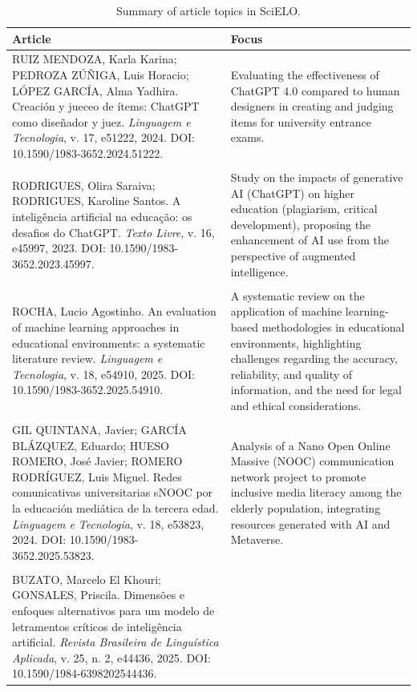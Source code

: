 \documentclass[english]{textolivre}
\begin{document}
\begin{table}[htbp]
\centering
\begin{threeparttable}
\caption{Summary of article topics in SciELO.}
\label{tab2}
\begin{tabular}{
  >{\raggedright\arraybackslash}p{7cm}
  >{\raggedright\arraybackslash}p{7cm}
  }
\toprule
Article & Focus \\
\midrule

RUIZ MENDOZA, Karla Karina; PEDROZA ZÚÑIGA, Luis Horacio; LÓPEZ GARCÍA, Alma Yadhira. Creación y jueceo de ítems: ChatGPT como diseñador y juez. \textit{Linguagem e Tecnologia}, v. 17, e51222, 2024. DOI: 10.1590/1983-3652.2024.51222.
&
Evaluating the effectiveness of ChatGPT 4.0 compared to human designers in creating and judging items for university entrance exams.\\
\\[-10pt]
RODRIGUES, Olira Saraiva; RODRIGUES, Karoline Santos. A inteligência artificial na educação: os desafios do ChatGPT. \textit{Texto Livre}, v. 16, e45997, 2023. DOI: 10.1590/1983-3652.2023.45997.
&
Study on the impacts of generative AI (ChatGPT) on higher education (plagiarism, critical development), proposing the enhancement of AI use from the perspective of augmented intelligence.
\\
\\[-10pt]
ROCHA, Lucio Agostinho. An evaluation of machine learning approaches in educational environments: a systematic literature review. \textit{Linguagem e Tecnologia}, v. 18, e54910, 2025. DOI: 10.1590/1983-3652.2025.54910.
&
A systematic review on the application of machine learning-based methodologies in educational environments, highlighting challenges regarding the accuracy, reliability, and quality of information, and the need for legal and ethical considerations.
\\
\\[-10pt]
GIL QUINTANA, Javier; GARCÍA BLÁZQUEZ, Eduardo; HUESO ROMERO, José Javier; ROMERO RODRÍGUEZ, Luis Miguel. Redes comunicativas universitarias sNOOC por la educación mediática de la tercera edad. \textit{Linguagem e Tecnologia}, v. 18, e53823, 2024. DOI: 10.1590/1983-3652.2025.53823.
&
Analysis of a Nano Open Online Massive (NOOC) communication network project to promote inclusive media literacy among the elderly population, integrating resources generated with AI and Metaverse.
\\
\\[-10pt]
BUZATO, Marcelo El Khouri; GONSALES, Priscila. Dimensões e enfoques alternativos para um modelo de letramentos críticos de inteligência artificial. \textit{Revista Brasileira de Linguística Aplicada}, v. 25, n. 2, e44436, 2025. DOI: 10.1590/1984-6398202544436.

\end{tabular}
\end{threeparttable}
\end{table}
\end{document}
